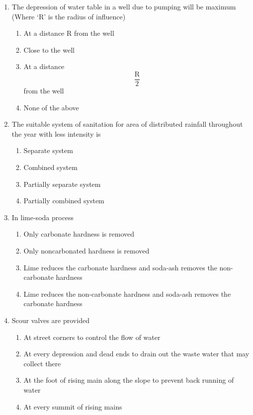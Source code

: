 \documentclass[11pt,a4paper]{article}
\begin{document}
\begin{enumerate}
\item{The depression of water table in a well due to pumping will be maximum \\
(Where `R' is the radius of influence)
}
\begin{enumerate}[label=\Alph*.]
\item{At a distance R from the well}
\item{Close to the well}
\item{At a distance $$\frac{{\text{R}}}{2}$$ from the well}
\item{None of the above}
\end{enumerate}
\item{The suitable system of sanitation for area of distributed rainfall throughout the year with less intensity is}
\begin{enumerate}[label=\Alph*.]
\item{Separate system}
\item{Combined system}
\item{Partially separate system}
\item{Partially combined system}
\end{enumerate}
\item{In lime-soda process}
\begin{enumerate}[label=\Alph*.]
\item{Only carbonate hardness is removed}
\item{Only noncarbonated hardness is removed}
\item{Lime reduces the carbonate hardness and soda-ash removes the non-carbonate hardness}
\item{Lime reduces the non-carbonate hardness and soda-ash removes the carbonate hardness}
\end{enumerate}
\item{Scour valves are provided}
\begin{enumerate}[label=\Alph*.]
\item{At street corners to control the flow of water}
\item{At every depression and dead ends to drain out the waste water that may collect there}
\item{At the foot of rising main along the slope to prevent back running of water}
\item{At every summit of rising mains}
\end{enumerate}

\end{enumerate}
\end{document}
